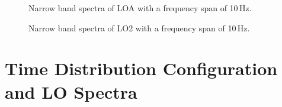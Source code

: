 \documentclass[12pt]{article}
\begin{document}
%
\begin{figure}[ht!]
\caption{Narrow band spectra of LOA with a frequency span of 10\,Hz.}
\label{fig:Measurement-Setup1-LOA-10Hz}
\end{figure}
%
%
\begin{figure}[ht!]
\caption{Narrow band spectra of LO2 with a frequency span of 10\,Hz.}
\label{fig:Measurement-Setup1-LO2-10Hz}
\end{figure}
%

\section{Time Distribution Configuration and LO Spectra}
\label{sec:4}
\end{document}
